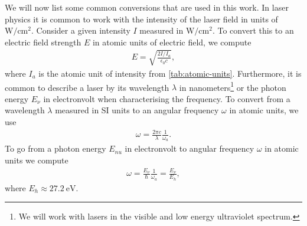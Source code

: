         We will now list some common conversions that are used in this work.
        In laser physics it is common to work with the intensity of the laser
        field in units of $\si{\watt/\cm^2}$.
        Consider a given intensity $I$ measured in $\si{\watt/\cm^2}$.
        To convert this to an electric field strength $E$ in atomic units of
        electric field, we compute
        \begin{align}
            E = \sqrt{\frac{2 I / I_a}{\epsilon_0 c}},
            \label{eq:intnsity-to-au-electric-field}
        \end{align}
        where $I_a$ is the atomic unit of intensity from
        \autoref{tab:atomic-units}.
        Furthermore, it is common to describe a laser by its wavelength
        $\lambda$ in nanometers\footnote{%
            We will work with lasers in the visible and low energy ultraviolet
            spectrum.
        } or the photon energy $E_{\nu}$ in electronvolt when characterising the
        frequency.
        To convert from a wavelength $\lambda$ measured in SI units to an
        angular frequency $\omega$ in atomic units, we use
        \begin{align}
            \omega = \frac{2\pi c}{\lambda}\frac{1}{\omega_a}.
        \end{align}
        To go from a photon energy $E_{nu}$ in electronvolt to angular frequency
        $\omega$ in atomic units we compute
        \begin{align}
            \omega = \frac{E_{\nu}}{\hslash}\frac{1}{\omega_a}
            = \frac{E_{\nu}}{E_h},
        \end{align}
        where $E_h \approx \SI{27.2}{\electronvolt}$.

\clearemptydoublepage
